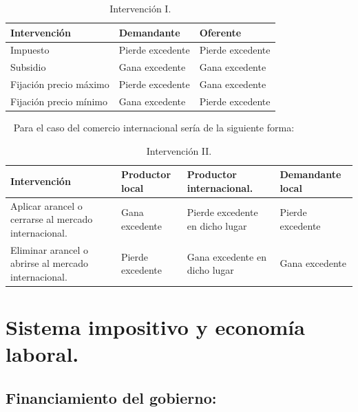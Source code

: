 \documentclass[
  letterpaper,
  DIV=11,
  numbers=noendperiod]{scrreport}
\begin{document}
\begin{table}[H]
    \centering
    \begin{tabular}{|p{45mm}|p{30mm}|p{30mm}|}
        \hline
        Intervención & Demandante & Oferente \\
        \hline
        Impuesto & Pierde excedente & Pierde excedente \\
        \hline
        Subsidio & Gana excedente & Gana excedente \\
        \hline
        Fijación precio máximo & Pierde excedente & Gana excedente \\
        \hline
        Fijación precio mínimo & Gana excedente & Pierde excedente \\
        \hline
    \end{tabular}
    \caption{Intervención I.}
    
\end{table}

~ Para el caso del comercio internacional sería de la siguiente forma:

\begin{table}[H]
    \centering
    \begin{tabular}{|p{48mm}|p{30mm}|p{30mm}|p{30mm}|}
        \hline
        Intervención & Productor local & Productor internacional. & Demandante local \\
        \hline
        Aplicar arancel o cerrarse al mercado internacional. & Gana excedente & Pierde excedente en dicho lugar & Pierde excedente \\
        \hline
        Eliminar arancel o abrirse al mercado internacional. & Pierde excedente & Gana excedente en dicho lugar & Gana excedente \\
        \hline
    \end{tabular}
    \caption{Intervención II.}
    
\end{table}


\hypertarget{sistema-impositivo-y-economuxeda-laboral.}{%
\chapter{Sistema impositivo y economía
laboral.}\label{sistema-impositivo-y-economuxeda-laboral.}}

\hypertarget{financiamiento-del-gobierno}{%
\section{Financiamiento del
gobierno:}\label{financiamiento-del-gobierno}}
\end{document}

